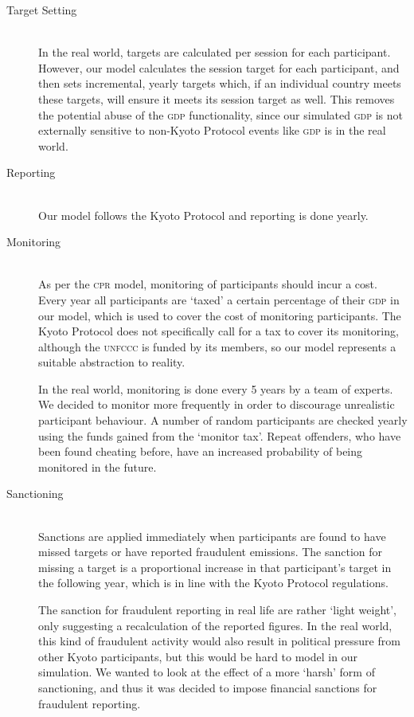\begin{description}
\item [Target Setting] \hfill \\ 
In the real world, targets are calculated per session for each participant. However, our model calculates the session target for each participant, and then sets incremental, yearly targets which, if an individual country meets these targets, will ensure it meets its session target as well. This removes the potential abuse of the \textsc{gdp} functionality, since our simulated \textsc{gdp} is not externally sensitive to non-Kyoto Protocol events like \textsc{gdp} is in the real world.

\item [Reporting] \hfill \\ 
Our model follows the Kyoto Protocol and reporting is done yearly.

\item [Monitoring] \hfill \\ 
As per the \textsc{cpr} model, monitoring of participants should incur a cost. Every year all participants are `taxed' a certain percentage of their \textsc{gdp} in our model, which is used to cover the cost of monitoring participants. The Kyoto Protocol does not specifically call for a tax to cover its monitoring, although the \textsc{unfccc} is funded by its members, so our model represents a suitable abstraction to reality.

In the real world, monitoring is done every 5 years by a team of experts. We decided to monitor more frequently in order to discourage unrealistic participant behaviour. A number of random participants are checked yearly using the funds gained from the `monitor tax'. Repeat offenders, who have been found cheating before, have an increased probability of being monitored in the future.

\item [Sanctioning] \hfill \\ 
Sanctions are applied immediately when participants are found to have missed targets or have reported fraudulent emissions. The sanction for missing a target is a proportional increase in that participant's target in the following year, which is in line with the Kyoto Protocol regulations.

The sanction for fraudulent reporting in real life are rather `light weight', only suggesting a recalculation of the reported figures. In the real world, this kind of fraudulent activity would also result in political pressure from other Kyoto participants, but this would be hard to model in our simulation. We wanted to look at the effect of a more `harsh' form of sanctioning, and thus it was decided to impose financial sanctions for fraudulent reporting.
\end{description}

